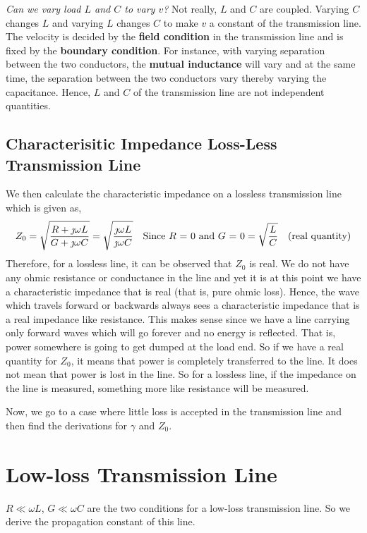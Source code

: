 \emph{Can we vary load $L$ and $C$ to vary $v$?} Not really, $L$ and $C$ are coupled. Varying $C$ changes $L$ and varying $L$ changes $C$ to make $v$ a constant of the transmission line. The velocity is decided by the \textbf{field condition} in the transmission line and is fixed by the \textbf{boundary condition}. For instance, with varying separation between the two conductors, the \textbf{mutual inductance} will vary and at the same time, the separation between the two conductors vary thereby varying the capacitance. Hence, $L$ and $C$ of the transmission line are not independent quantities.

\subsection{Characterisitic Impedance Loss-Less Transmission Line}
We then calculate the characteristic impedance on a lossless transmission line which is given as,
\begin{dmath*}
Z_0 = \sqrt{\frac{R + \jmath\omega L}{G + \jmath\omega C}}
= \sqrt{\frac{\jmath\omega L}{\jmath\omega C}}\quad\text{Since }R\text{ = }0\text{ and }G\text{ = }0
= \sqrt{\frac{L}{C}} \quad\textnormal{(real quantity)}
\end{dmath*}
Therefore, for a lossless line, it can be observed that $Z_0$ is real. We do not have any ohmic resistance or conductance in the line and yet it is at this point we have a characteristic impedance that is real (that is, pure ohmic loss). Hence, the wave which travels forward or backwards always sees a characteristic impedance that is a real impedance like resistance. This makes sense since we have a line carrying only forward waves which will go forever and no energy is reflected. That is, power somewhere is going to get dumped at the load end. So if we have a real quantity for $Z_0$, it means that power is completely transferred to the line. It does not mean that power is lost in the line. So for a lossless line, if the impedance on the line is measured, something more like resistance will be measured.

Now, we go to a case where little loss is accepted in the transmission line and then find the derivations for $\gamma$ and $Z_0$.

\section{Low-loss Transmission Line}
$R\ll\omega L$, $G\ll\omega C$ are the two conditions for a low-loss transmission line. So we derive the propagation constant of this line.

